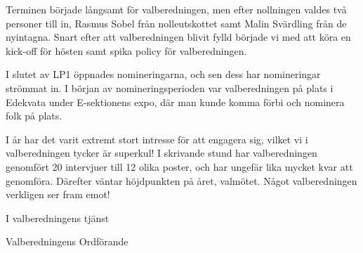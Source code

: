 \documentclass[../_main/handlingar.tex]{subfiles}
\begin{document}
Terminen började långsamt för valberedningen, men efter nollningen valdes två personer till in, Rasmus Sobel från nolleutskottet samt Malin Svärdling från de nyintagna. Snart efter att valberedningen blivit fylld började vi med att köra en kick-off för hösten samt spika policy för valberedningen.


I slutet av LP1 öppnades nomineringarna, och sen dess har nomineringar strömmat in. I början av nomineringsperioden var valberedningen på plats i Edekvata under E-sektionens expo, där man kunde komma förbi och nominera folk på plats.

I år har det varit extremt stort intresse för att engagera sig, vilket vi i valberedningen tycker är superkul! I skrivande stund har valberedningen genomfört 20 intervjuer till 12 olika poster, och har ungefär lika mycket kvar att genomföra. Därefter väntar höjdpunkten på året, valmötet. Något valberedningen verkligen ser fram emot! 

\begin{signatures}{1}
    I valberedningens tjänst
    \signature{Pontus Landgren}{Valberedningens Ordförande}
\end{signatures}
\end{document}
